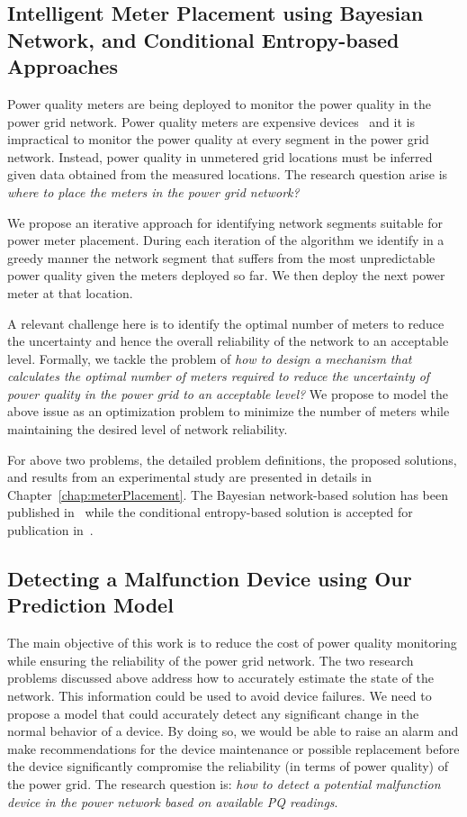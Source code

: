 \subsection{Intelligent Meter Placement using Bayesian Network, and Conditional Entropy-based Approaches}
Power quality meters are being deployed to monitor the power quality in the power grid network. Power quality meters are expensive devices~\cite{fluke_meter, schneider_meter} and it is impractical to monitor the power quality at every segment in the power grid network. Instead, power quality in unmetered grid locations must be inferred given data obtained from the measured locations. The research question arise is \textit{where to place the meters in the power grid network?}
	
We propose an iterative approach for identifying network segments suitable for power meter placement. During each iteration of the algorithm we identify in a greedy manner the network segment that suffers from the most unpredictable power quality given the meters deployed so far. We then deploy the next power meter at that location.

A relevant challenge here is to identify the optimal number of meters to reduce the uncertainty and hence the overall reliability of the network to an acceptable level. Formally, we tackle the problem of \textit{how to design a mechanism that calculates the optimal number of meters required to reduce the uncertainty of power quality in the power grid to an acceptable level?} We propose to model the above issue as an optimization problem to minimize the number of meters while maintaining the desired level of network reliability.

For above two problems, the detailed problem definitions, the proposed solutions, and results from an experimental study are presented in details in Chapter~\ref{chap:meterPlacement}. The Bayesian network-based solution has been published in~\cite{ali2013intelligent} while the conditional entropy-based solution is accepted for publication in~\cite{alimachine}.

\subsection{Detecting a Malfunction Device using Our Prediction Model}
The main objective of this work is to reduce the cost of power quality monitoring while ensuring the reliability of the power grid network. The two research problems discussed above address how to accurately estimate the state of the network. This information could be used to avoid device failures. We need to propose a model that could accurately detect any significant change in the normal behavior of a device. By doing so, we would be able to raise an alarm and make recommendations for the device maintenance or possible replacement before the device significantly compromise the reliability (in terms of power quality) of the power grid. The research question is: \textit{how to detect a potential malfunction device in the power network based on available PQ readings}.

